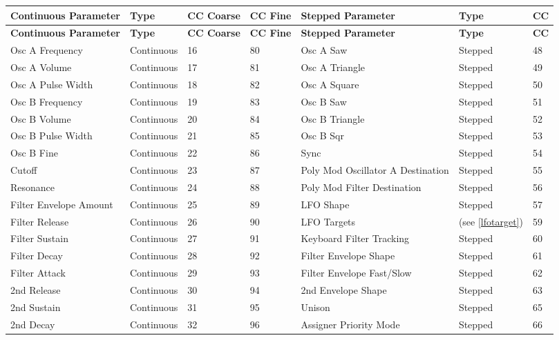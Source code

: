 \begin{longtable}[l]{ p{5cm}|p{2cm}|p{1.5cm}|p{1.5cm}|p{5cm}|p{2cm}|p{1cm}} 
\textbf{Continuous Parameter} & \textbf{Type} & \textbf{CC Coarse} & \textbf{CC Fine} & \textbf{Stepped Parameter} & \textbf{Type} & \textbf{CC} \\ \hline
\endfirsthead
\textbf{Continuous Parameter} & \textbf{Type} & \textbf{CC Coarse} & \textbf{CC Fine} & \textbf{Stepped Parameter} & \textbf{Type} & \textbf{CC} \\ \hline
\endhead 
Osc A Frequency & Continuous & 16 & 80 & Osc A Saw & Stepped & 48 \\ \hline
Osc A Volume & Continuous & 17 & 81 & Osc A Triangle & Stepped & 49 \\ \hline
Osc A Pulse Width & Continuous & 18 & 82 & Osc A Square & Stepped & 50 \\ \hline
Osc B Frequency & Continuous & 19 & 83 & Osc B Saw & Stepped & 51 \\ \hline
Osc B Volume & Continuous & 20 & 84 & Osc B Triangle & Stepped & 52 \\ \hline
Osc B Pulse Width & Continuous & 21 & 85 & Osc B Sqr & Stepped & 53 \\ \hline
Osc B Fine & Continuous & 22 & 86 & Sync & Stepped & 54 \\ \hline
Cutoff & Continuous & 23 & 87 & Poly Mod Oscillator A Destination & Stepped & 55 \\ \hline
Resonance & Continuous & 24 & 88 & Poly Mod Filter Destination & Stepped & 56 \\ \hline
Filter Envelope Amount & Continuous & 25 & 89 & LFO Shape & Stepped & 57 \\ \hline
Filter Release  &  Continuous  & 26 & 90 &  LFO Targets  &  (see \ref{lfotarget})  &  59 \\ \hline
Filter Sustain  &  Continuous  & 27 & 91 &  Keyboard Filter Tracking  &  Stepped  &  60 \\ \hline
Filter Decay  &  Continuous  & 28 & 92 &  Filter Envelope Shape  &  Stepped  &  61 \\ \hline
Filter Attack  &  Continuous  & 29 & 93 &  Filter Envelope Fast/Slow  &  Stepped  &  62 \\ \hline
2nd Release  &  Continuous  & 30 & 94 &  2nd Envelope Shape  &  Stepped  &  63 \\ \hline
2nd Sustain  &  Continuous  & 31 & 95 &  Unison  &  Stepped  &  65 \\ \hline
2nd Decay  &  Continuous  & 32 & 96 &  Assigner Priority Mode  &  Stepped  &  66 \\ \hline

\end{longtable}
